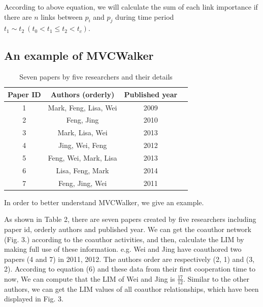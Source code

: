 \documentclass[10pt,journal,compsoc]{IEEEtran}
\begin{document}
According to above equation, we will calculate the sum of each link importance if there are $n$ links between $p_{i}$ and $p_{j}$ during time period $t_{1}\sim t_{2}\ (t_{0} < t_{1}\leq t_{2} < t_{c})$.

\subsection{An example of MVCWalker}

\begin{table}
\renewcommand{\arraystretch}{1.2}
\centering
\caption{Seven papers by five researchers and their details}
\begin{tabular}{|c|c|c|c|} \hline
Paper ID&Authors (orderly)&Published year\\ \hline
1 & Mark, Feng, Lisa, Wei &2009 \\ \hline
2 & Feng, Jing &2010 \\ \hline
3 & Mark, Lisa, Wei &2013 \\ \hline
4 & Jing, Wei, Feng &2012 \\ \hline
5 & Feng, Wei, Mark, Lisa &2013 \\ \hline
6 & Lisa, Feng, Mark &2014 \\ \hline
7 & Feng, Jing, Wei &2011 \\ \hline

\hline\end{tabular}
\end{table}
In order to better understand MVCWalker, we give an example.

As shown in Table 2, there are seven papers created by five researchers including paper id, orderly authors and published year. We can get the coauthor network (Fig. 3.) according to the coauthor activities, and then, calculate the LIM by making full use of these information. e.g. Wei and Jing have coauthored two papers (4 and 7) in 2011, 2012. The authors order are respectively (2, 1) and (3, 2). According to equation (6) and these data from their first cooperation time to now, We can compute that the LIM of Wei and Jing is $\frac{17}{12}$. Similar to the other authors, we can get the LIM values of all coauthor relationships, which have been displayed in Fig. 3.
\end{document}
